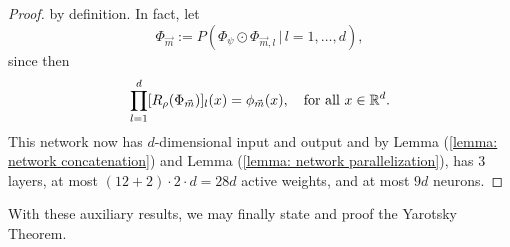 \begin{proof}
    by definition. In fact, let 
    \begin{equation*}
        \Phi_{\vec{m}} := P(\Phi_\psi \odot \Phi_{\vec{m}, l} \, \vert \, l = 1, \dots, d),
    \end{equation*}
    since then
    \begin{equation*}
        \prod_{l=1}^d [R_\rho(\Phi_{\vec{m}})]_l(x) = \phi_{\vec{m}}(x), \quad \text{for all }x \in \mathbb{R}^d.
    \end{equation*}
    This network now has $d$-dimensional input and output and by Lemma (\ref{lemma: network concatenation}) and Lemma (\ref{lemma: network parallelization}),
    has $3$ layers, at most $(12 + 2) \cdot 2 \cdot d = 28 d$ active weights, and at most $9d$ neurons.
\end{proof}

With these auxiliary results, we may finally state and proof the Yarotsky Theorem.

